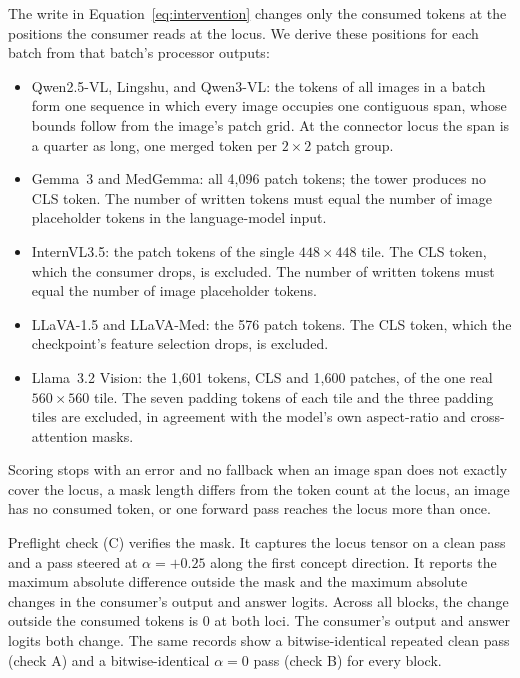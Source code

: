 \documentclass{article}
\begin{document}
The write in Equation~\ref{eq:intervention} changes only the consumed tokens at the positions the consumer reads at the locus. We derive these positions for each batch from that batch's processor outputs:

\begin{itemize}[leftmargin=*,itemsep=1pt,topsep=2pt]
\item Qwen2.5-VL, Lingshu, and Qwen3-VL: the tokens of all images in a batch form one sequence in which every image occupies one contiguous span, whose bounds follow from the image's patch grid. At the connector locus the span is a quarter as long, one merged token per $2\times2$ patch group.
\item Gemma~3 and MedGemma: all 4{,}096 patch tokens; the tower produces no CLS token. The number of written tokens must equal the number of image placeholder tokens in the language-model input.
\item InternVL3.5: the patch tokens of the single $448\times448$ tile. The CLS token, which the consumer drops, is excluded. The number of written tokens must equal the number of image placeholder tokens.
\item LLaVA-1.5 and LLaVA-Med: the 576 patch tokens. The CLS token, which the checkpoint's feature selection drops, is excluded.
\item Llama~3.2 Vision: the 1{,}601 tokens, CLS and 1{,}600 patches, of the one real $560\times560$ tile. The seven padding tokens of each tile and the three padding tiles are excluded, in agreement with the model's own aspect-ratio and cross-attention masks.
\end{itemize}

Scoring stops with an error and no fallback when an image span does not exactly cover the locus, a mask length differs from the token count at the locus, an image has no consumed token, or one forward pass reaches the locus more than once.

Preflight check (C) verifies the mask. It captures the locus tensor on a clean pass and a pass steered at $\alpha=+0.25$ along the first concept direction. It reports the maximum absolute difference outside the mask and the maximum absolute changes in the consumer's output and answer logits. Across all \cfBlocks{} blocks, the change outside the consumed tokens is $0$ at both loci. The consumer's output and answer logits both change. The same records show a bitwise-identical repeated clean pass (check A) and a bitwise-identical $\alpha=0$ pass (check B) for every block.
\end{document}
